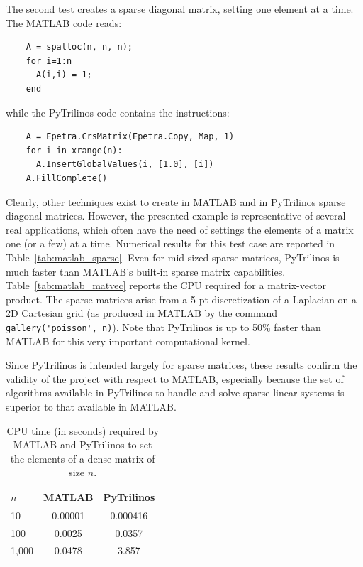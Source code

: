 \documentclass[acmtocl]{acmtrans2m}
\begin{document}
The second test creates a sparse diagonal matrix, setting
one element at a time. The MATLAB code reads:
\begin{verbatim}
    A = spalloc(n, n, n);
    for i=1:n
      A(i,i) = 1;
    end
\end{verbatim}
while the PyTrilinos code contains the instructions:
\begin{verbatim}
    A = Epetra.CrsMatrix(Epetra.Copy, Map, 1)
    for i in xrange(n):
      A.InsertGlobalValues(i, [1.0], [i])
    A.FillComplete()
\end{verbatim}
Clearly, other techniques exist to create in MATLAB and in PyTrilinos
sparse diagonal matrices. However, the presented example is representative of
several real applications, which often have the
need of settings the elements of a matrix one (or a few) at a time. Numerical
results for this test case are reported in Table~\ref{tab:matlab_sparse}. Even
for mid-sized sparse matrices, PyTrilinos is much faster than MATLAB's
built-in sparse matrix capabilities.
Table~\ref{tab:matlab_matvec} reports the CPU required for a matrix-vector
product. The sparse matrices arise from
a 5-pt discretization of a Laplacian on a 2D Cartesian grid 
(as produced in MATLAB by the command \verb!gallery('poisson', n)!).  Note
that PyTrilinos is up to 50\% faster than MATLAB for this very
important computational kernel.

Since PyTrilinos is intended largely
for sparse matrices, these results confirm the validity of the project
with respect to MATLAB, especially because the set of algorithms
available in PyTrilinos to handle and solve sparse linear systems is
superior to that available in MATLAB. 

\begin{table}
  \begin{center}
    \begin{tabular}{| l | c | c |}
      \hline
      $n$ & MATLAB & PyTrilinos \\
      \hline
      \hline
      10     & 0.00001 & 0.000416 \\
      100    & 0.0025 & 0.0357    \\
      1,000  & 0.0478 & 3.857     \\
      \hline
    \end{tabular}
    \caption{CPU time (in seconds) required by MATLAB and PyTrilinos
      to set the elements of a dense matrix of size $n$.}
    \label{tab:matlab_dense}
  \end{center}
\end{table}
\end{document}
